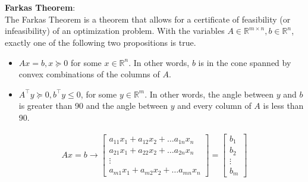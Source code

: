\\ \\ 
\textbf{Farkas Theorem}: 
\\
The Farkas Theorem is a theorem that allows for a certificate of feasibility (or infeasibility) of an optimization problem. With the variables $A \in \mathbb{R}^{m \times n}, b \in \mathbb{R}^n$, exactly one of the following two propositions is true.
\begin{itemize}
  \item $Ax = b, x \succeq 0$ for some $x \in \mathbb{R}^n$. In other words, $b$ is in the cone spanned by convex combinations of the columns of $A$.
  \item $A^\top y \succeq 0, b^\top y \leq 0$, for some $y \in \mathbb{R}^m$. In other words, the angle between $y$ and $b$ is greater than 90 and the angle between $y$ and every column of $A$ is less than 90. 
\end{itemize}

\begin{align}
  Ax = b \to 
  \begin{bmatrix}
     a_{11} x_1 + a_{12} x_2 + \dots a_{1n} x_n \\
     a_{21} x_1 + a_{22} x_2 + \dots a_{2n} x_n \\
     \vdots \\
     a_{m1} x_1 + a_{m2} x_2 + \dots a_{mn} x_n
  \end{bmatrix}
  =
  \begin{bmatrix}
    b_1 \\
    b_2 \\
    \vdots \\
    b_m
  \end{bmatrix}
\end{align}
